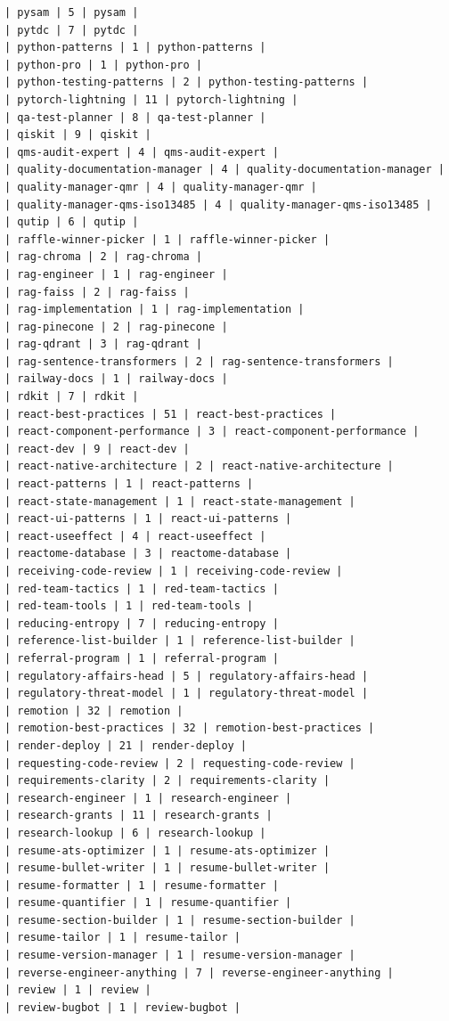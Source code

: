 \begin{Verbatim}[breaklines,breakanywhere,fontsize=\footnotesize]
| pysam | 5 | pysam |
| pytdc | 7 | pytdc |
| python-patterns | 1 | python-patterns |
| python-pro | 1 | python-pro |
| python-testing-patterns | 2 | python-testing-patterns |
| pytorch-lightning | 11 | pytorch-lightning |
| qa-test-planner | 8 | qa-test-planner |
| qiskit | 9 | qiskit |
| qms-audit-expert | 4 | qms-audit-expert |
| quality-documentation-manager | 4 | quality-documentation-manager |
| quality-manager-qmr | 4 | quality-manager-qmr |
| quality-manager-qms-iso13485 | 4 | quality-manager-qms-iso13485 |
| qutip | 6 | qutip |
| raffle-winner-picker | 1 | raffle-winner-picker |
| rag-chroma | 2 | rag-chroma |
| rag-engineer | 1 | rag-engineer |
| rag-faiss | 2 | rag-faiss |
| rag-implementation | 1 | rag-implementation |
| rag-pinecone | 2 | rag-pinecone |
| rag-qdrant | 3 | rag-qdrant |
| rag-sentence-transformers | 2 | rag-sentence-transformers |
| railway-docs | 1 | railway-docs |
| rdkit | 7 | rdkit |
| react-best-practices | 51 | react-best-practices |
| react-component-performance | 3 | react-component-performance |
| react-dev | 9 | react-dev |
| react-native-architecture | 2 | react-native-architecture |
| react-patterns | 1 | react-patterns |
| react-state-management | 1 | react-state-management |
| react-ui-patterns | 1 | react-ui-patterns |
| react-useeffect | 4 | react-useeffect |
| reactome-database | 3 | reactome-database |
| receiving-code-review | 1 | receiving-code-review |
| red-team-tactics | 1 | red-team-tactics |
| red-team-tools | 1 | red-team-tools |
| reducing-entropy | 7 | reducing-entropy |
| reference-list-builder | 1 | reference-list-builder |
| referral-program | 1 | referral-program |
| regulatory-affairs-head | 5 | regulatory-affairs-head |
| regulatory-threat-model | 1 | regulatory-threat-model |
| remotion | 32 | remotion |
| remotion-best-practices | 32 | remotion-best-practices |
| render-deploy | 21 | render-deploy |
| requesting-code-review | 2 | requesting-code-review |
| requirements-clarity | 2 | requirements-clarity |
| research-engineer | 1 | research-engineer |
| research-grants | 11 | research-grants |
| research-lookup | 6 | research-lookup |
| resume-ats-optimizer | 1 | resume-ats-optimizer |
| resume-bullet-writer | 1 | resume-bullet-writer |
| resume-formatter | 1 | resume-formatter |
| resume-quantifier | 1 | resume-quantifier |
| resume-section-builder | 1 | resume-section-builder |
| resume-tailor | 1 | resume-tailor |
| resume-version-manager | 1 | resume-version-manager |
| reverse-engineer-anything | 7 | reverse-engineer-anything |
| review | 1 | review |
| review-bugbot | 1 | review-bugbot |

\end{Verbatim}
